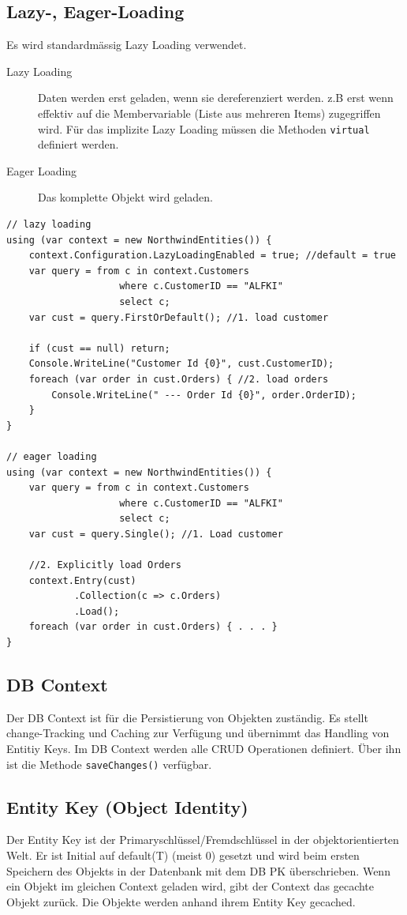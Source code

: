 \subsection{Lazy-, Eager-Loading}
Es wird standardmässig Lazy Loading verwendet. 
\begin{description}
	\item[Lazy Loading] Daten werden erst geladen, wenn sie dereferenziert werden. z.B erst wenn effektiv auf die Membervariable (Liste aus mehreren Items) zugegriffen wird. Für das implizite Lazy Loading müssen die Methoden \lstinline|virtual| definiert werden. 
	\item[Eager Loading] Das komplette Objekt wird geladen.
\end{description}
\begin{lstlisting}
// lazy loading
using (var context = new NorthwindEntities()) {
	context.Configuration.LazyLoadingEnabled = true; //default = true
	var query = from c in context.Customers
					where c.CustomerID == "ALFKI"
					select c;
	var cust = query.FirstOrDefault(); //1. load customer 

	if (cust == null) return;
	Console.WriteLine("Customer Id {0}", cust.CustomerID);
	foreach (var order in cust.Orders) { //2. load orders
		Console.WriteLine("	--- Order Id {0}", order.OrderID);
	}
}

// eager loading
using (var context = new NorthwindEntities()) {
	var query = from c in context.Customers
					where c.CustomerID == "ALFKI"
					select c;
	var cust = query.Single(); //1. Load customer
	
	//2. Explicitly load Orders
	context.Entry(cust)
			.Collection(c => c.Orders)
			.Load();
	foreach (var order in cust.Orders) { . . . }
}
\end{lstlisting}

\subsection{DB Context}
Der DB Context ist für die Persistierung von Objekten zuständig. Es stellt change-Tracking und Caching zur Verfügung und übernimmt das Handling von Entitiy Keys. Im DB Context werden alle CRUD Operationen definiert. Über ihn ist die Methode \lstinline|saveChanges()| verfügbar.

\subsection{Entity Key (Object Identity)}
Der Entity Key ist der Primaryschlüssel/Fremdschlüssel in der objektorientierten Welt. Er ist Initial auf default(T) (meist 0) gesetzt und wird beim ersten Speichern des Objekts in der Datenbank mit dem DB PK überschrieben. Wenn ein Objekt im gleichen Context geladen wird, gibt der Context das gecachte Objekt zurück. Die Objekte werden anhand ihrem Entity Key gecached. 

